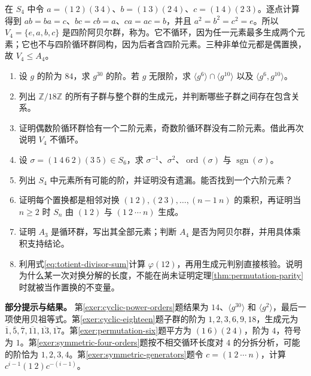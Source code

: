 \documentclass[UTF8,12pt,a4paper,fontset=fandol]{ctexbook}
\begin{document}
\begin{example}[阿贝尔群未必循环]\label{ex:klein-four}
在 $S_4$ 中令 $a=(1\ 2)(3\ 4)$、$b=(1\ 3)(2\ 4)$、$c=(1\ 4)(2\ 3)$。逐点计算得到 $ab=ba=c$、$bc=cb=a$、$ca=ac=b$，并且 $a^2=b^2=c^2=e$。所以 $V_4=\{e,a,b,c\}$ 是四阶阿贝尔群，称为。它不循环，因为任一元素最多生成两个元素；它也不与四阶循环群同构，因为后者含四阶元素。三种非单位元都是偶置换，故 $V_4\leq A_4$。
\end{example}

\begin{enumerate}
  \item\label{exer:cyclic-power-orders} 设 $g$ 的阶为 $84$，求 $g^{30}$ 的阶。若 $g$ 无限阶，求 $\langle g^6\rangle\cap\langle g^{10}\rangle$ 以及 $\langle g^6,g^{10}\rangle$。
  \item\label{exer:cyclic-eighteen} 列出 $\mathbb Z/18\mathbb Z$ 的所有子群与整个群的生成元，并判断哪些子群之间存在包含关系。
  \item\label{exer:cyclic-involution} 证明偶数阶循环群恰有一个二阶元素，奇数阶循环群没有二阶元素。借此再次说明 $V_4$ 不循环。
  \item\label{exer:permutation-six} 设 $\sigma=(1\ 4\ 6\ 2)(3\ 5)\in S_6$，求 $\sigma^{-1}$、$\sigma^2$、$\operatorname{ord}(\sigma)$ 与 $\operatorname{sgn}(\sigma)$。
  \item\label{exer:symmetric-four-orders} 列出 $S_4$ 中元素所有可能的阶，并证明没有遗漏。能否找到一个六阶元素？
  \item\label{exer:symmetric-generators} 证明每个置换都是相邻对换 $(1\ 2),(2\ 3),\ldots,(n-1\ n)$ 的乘积，再证明当 $n\geq2$ 时 $S_n$ 由 $(1\ 2)$ 与 $(1\ 2\ \cdots\ n)$ 生成。
  \item\label{exer:small-alternating-groups} 证明 $A_3$ 是循环群，写出其全部元素；判断 $A_4$ 是否为阿贝尔群，并用具体乘积支持结论。
  \item\label{exer:totient-and-parity} 利用式\eqref{eq:totient-divisor-sum}计算 $\varphi(12)$，再用生成元判别直接核验。说明为什么某一次对换分解的长度，不能在尚未证明定理\ref{thm:permutation-parity}时就被当作置换的不变量。
\end{enumerate}

\textbf{部分提示与结果。} 第\ref{exer:cyclic-power-orders}题结果为 $14$、$\langle g^{30}\rangle$ 和 $\langle g^2\rangle$，最后一项使用贝祖等式。第\ref{exer:cyclic-eighteen}题子群的阶为 $1,2,3,6,9,18$，生成元为 $\overline1,\overline5,\overline7,\overline{11},\overline{13},\overline{17}$。第\ref{exer:permutation-six}题平方为 $(1\ 6)(2\ 4)$，阶为 $4$，符号为 $1$。第\ref{exer:symmetric-four-orders}题按不相交循环长度对 $4$ 的分拆分析，可能的阶恰为 $1,2,3,4$。第\ref{exer:symmetric-generators}题令 $c=(1\ 2\ \cdots\ n)$，计算 $c^{i-1}(1\ 2)c^{-(i-1)}$。
\end{document}
